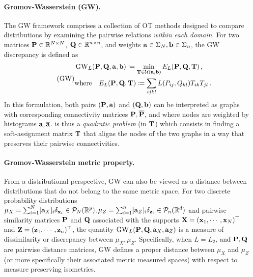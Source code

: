 \paragraph{Gromov-Wasserstein (GW).} The GW framework \citep{memoli2011gromov,sturm2012space} comprises a collection of OT methods designed to compare distributions by examining the pairwise relations \emph{within each domain}. For two matrices ${\mathbf{P}} \in \mathbb{R}^{N \times N}$, ${\mathbf{Q}} \in \mathbb{R}^{n \times n}$, and weights ${\mathbf{a}} \in \Sigma_N, {\mathbf{b}} \in \Sigma_n$, the GW discrepancy is defined as
\begin{equation}
\label{eq:gw_pb} 
\tag{GW}
\begin{split}
	&\operatorname{GW}_L ({\mathbf{P}}, {\mathbf{Q}}, {\mathbf{a}}, {\mathbf{b}}) \coloneqq \min_{{\mathbf{T}} \in {\mathcal{U}}({\mathbf{a}}, {\mathbf{b}})} E_L({\mathbf{P}}, {\mathbf{Q}}, {\mathbf{T}})\,, \\
	&\text{where} \quad E_L({\mathbf{P}}, {\mathbf{Q}}, {\mathbf{T}}) \coloneqq \sum_{ijkl}  L(P_{ij}, Q_{kl}) T_{ik} T_{jl} \:.
\end{split}
\end{equation}
In this formulation, both pairs $({\mathbf{P}}, {\mathbf{a}})$ and $({\mathbf{Q}}, {\mathbf{b}})$ can be interpreted as graphs with corresponding connectivity matrices ${\mathbf{P}}, \overline {{\mathbf{P}}}$, and where nodes are weighted by histograms ${\mathbf{a}}, \overline {{\mathbf{a}}}$.  is thus a \emph{quadratic problem} (in ${\mathbf{T}}$) which consists in finding a soft-assignment matrix ${\mathbf{T}}$ that aligns the nodes of the two graphs in a way that preserves their pairwise connectivities. 

\paragraph{Gromov-Wasserstein metric property.}
From a distributional perspective, GW can also be viewed as a distance between distributions that do not belong to the same metric space. For two discrete probability distributions $\mu_X = \sum_{i=1}^N [{\mathbf{a}}_X]_i \delta_{{\mathbf{x}}_i} \in {\mathcal{P}}_N(\mathbb{R}^{p}), \mu_Z =\sum_{i=1}^n [{\mathbf{a}}_Z]_i \delta_{{\mathbf{z}}_i} \in {\mathcal{P}}_n(\mathbb{R}^d)$ and pairwise similarity matrices ${\mathbf{P}}$ and ${\mathbf{Q}}$ associated with the supports ${\mathbf{X}} = ({\mathbf{x}}_1, \cdots, {\mathbf{x}}_N)^\top$ and ${\mathbf{Z}} = ({\mathbf{z}}_1, \cdots, {\mathbf{z}}_n)^\top$, the quantity $\operatorname{GW}_L ({\mathbf{P}}, {\mathbf{Q}}, {\mathbf{a}}_X, {\mathbf{a}}_Z)$ is a measure of dissimilarity or discrepancy between $\mu_X, \mu_Z$. Specifically, when $L=L_2$, and ${\mathbf{P}}, {\mathbf{Q}}$ are pairwise distance matrices, GW defines a proper distance between $\mu_X$ and $\mu_Z$ (or more specifically their associated metric measured spaces) with respect to measure preserving isometries.

